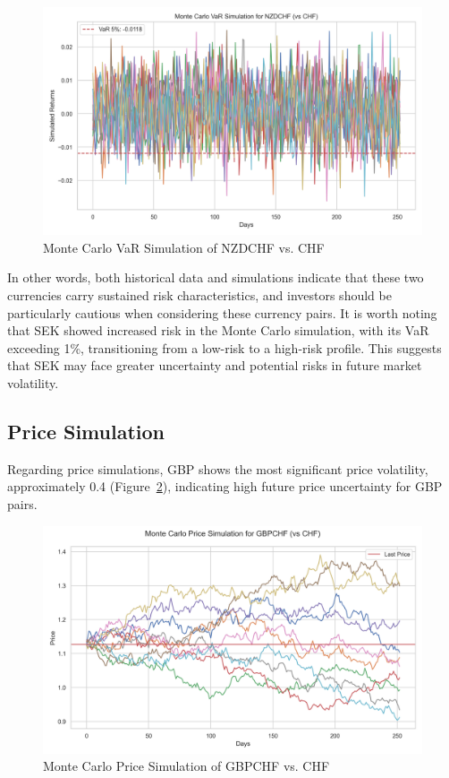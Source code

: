 \documentclass{article}
\begin{document}
\begin{figure}[h]
    \centering
    \includegraphics[width=0.75\linewidth]{reports/figures/monte_carlo_var_simulation_NZDCHF_vs_CHF.png}
    \caption{Monte Carlo VaR Simulation of NZDCHF vs. CHF}  \label{fig:monte_carlo_var_simulation_NZDCHF_vs_CHF}
\end{figure}

In other words, both historical data and simulations indicate that these two currencies carry sustained risk characteristics, and investors should be particularly cautious when considering these currency pairs. It is worth noting that SEK showed increased risk in the Monte Carlo simulation, with its VaR exceeding 1\%, transitioning from a low-risk to a high-risk profile. This suggests that SEK may face greater uncertainty and potential risks in future market volatility.

\subsection{Price Simulation}
Regarding price simulations, GBP shows the most significant price volatility, approximately 0.4 (Figure~\ref{fig:monte_carlo_price_simulation_GBPCHF_vs_CHF}), indicating high future price uncertainty for GBP pairs. 

\begin{figure}[h]
    \centering  \includegraphics[width=0.75\linewidth]{reports/figures/monte_carlo_price_simulation_GBPCHF_vs_CHF.png}
    \caption{Monte Carlo Price Simulation of GBPCHF vs. CHF}  \label{fig:monte_carlo_price_simulation_GBPCHF_vs_CHF}
\end{figure}
\end{document}
